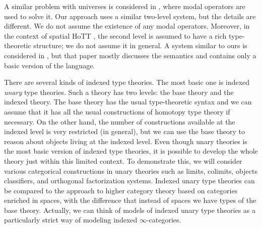 \documentclass[reqno]{mscs}
\numberwithin{figure}{section}
\begin{document}
A similar problem with universes is considered in \cite{int-univ-hott}, where modal operators are used to solve it.
Our approach uses a similar two-level system, but the details are different.
We do not assume the existence of any modal operators.
Moreover, in the context of spatial HoTT \cite{cohesive-hott}, the second level is assumed to have a rich type-theoretic structure; we do not assume it in general.
A system similar to ours is considered in \cite{fib-fib-cats}, but that paper mostly discusses the semantics and contains only a basic version of the language.

There are several kinds of indexed type theories.
The most basic one is indexed \emph{unary} type theories.
Such a theory has two levels: the base theory and the indexed theory.
The base theory has the usual type-theoretic syntax and we can assume that it has all the usual constructions of homotopy type theory if necessary.
On the other hand, the number of constructions available at the indexed level is very restricted (in general), but we can use the base theory to reason about objects living at the indexed level.
Even though unary theories is the most basic version of indexed type theories, it is possible to develop the whole theory just within this limited context.
To demonstrate this, we will consider various categorical constructions in unary theories such as limits, colimits, objects classifiers, and orthogonal factorization systems.
Indexed unary type theories can be compared to the approach to higher category theory based on categories enriched in spaces, with the difference that instead of spaces we have types of the base theory.
Actually, we can think of models of indexed unary type theories as a particularly strict way of modeling indexed $\infty$-categories.
\end{document}
